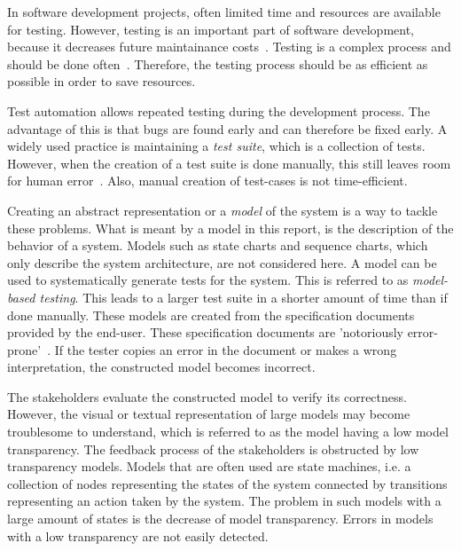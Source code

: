 In software development projects, often limited time and resources are available for testing. However, testing is an important part of software development, because it decreases future maintainance costs~\cite{McConnell:testing}. Testing is a complex process and should be done often~\cite{Pol:testing}. Therefore, the testing process should be as efficient as possible in order to save resources.

Test automation allows repeated testing during the development process. The advantage of this is that bugs are found early and can therefore be fixed early.  A widely used practice is maintaining a \textit{test suite}, which is a collection of tests. However, when the creation of a test suite is done manually, this still leaves room for human error~\cite{Blackburn:testing}. Also, manual creation of test-cases is not time-efficient.

Creating an abstract representation or a \textit{model} of the system is a way to tackle these problems. What is meant by a model in this report, is the description of the behavior of a system. Models such as state charts and sequence charts, which only describe the system architecture, are not considered here. A model can be used to systematically generate tests for the system. This is referred to as \textit{model-based testing}. This leads to a larger test suite in a shorter amount of time than if done manually. These models are created from the specification documents provided by the end-user. These specification documents are 'notoriously error-prone'~\cite{McCabe:testing}. If the tester copies an error in the document or makes a wrong interpretation, the constructed model becomes incorrect.

The stakeholders evaluate the constructed model to verify its correctness. However, the visual or textual representation of large models may become troublesome to understand, which is referred to as the model having a low model transparency. The feedback process of the stakeholders is obstructed by low transparency models. Models that are often used are state machines, i.e. a collection of nodes representing the states of the system connected by transitions representing an action taken by the system. The problem in such models with a large amount of states is the decrease of model transparency. Errors in models with a low transparency are not easily detected.

